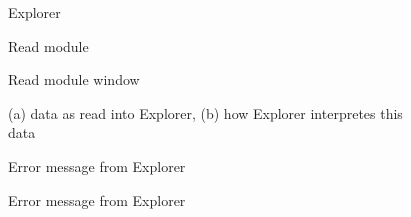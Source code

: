 {\samepage \clearpage \begin{figure}%
\setlength{\epsfxsize}{18cm}
\centerline{}
\caption{Explorer}
\label{explorermain.diag}
\end{figure}
}


\newpage

{\samepage \clearpage \begin{figure}%
\setlength{\epsfxsize}{6cm}
\centerline{}
\caption{Read module}
\end{figure}
}


\newpage

{\samepage \clearpage \begin{figure}%
\setlength{\epsfxsize}{8cm}
\centerline{}
\caption{Read module window}
\label{read.diag}
\end{figure}
}


\newpage

{\samepage \clearpage \begin{figure}%
\setlength{\epsfxsize}{8cm}
\centerline{}
\caption{(a) data as read into Explorer, 
(b) how Explorer interpretes this data}
\label{translatingdata.diag}
\end{figure}
}


\newpage

{\samepage \clearpage \begin{figure}%
\setlength{\epsfxsize}{8cm}
\centerline{}
\caption{Error message from Explorer}
\label{error1.diag}
\end{figure}
}


\newpage

{\samepage \clearpage \begin{figure}%
\setlength{\epsfxsize}{10cm}
\centerline{}
\caption{Error message from Explorer}
\label{error2.diag}
\end{figure}
}


\newpage

